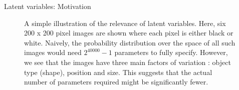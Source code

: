 %     
%     

\begin{frame}{Latent variables: Motivation}
  \begin{figure}
    \centering
\caption{\footnotesize A simple illustration of the relevance of latent variables. Here, six 200 x 200 pixel images are shown where each pixel is either black or white. Naively, the probability distribution over the space of all such images would need $2^{40000}-1$ parameters to fully specify. However, we see that the images have three main factors of variation : object type (shape), position and size. This suggests that the actual number of parameters required might be significantly fewer. }
 \end{figure}
\end{frame}


 



